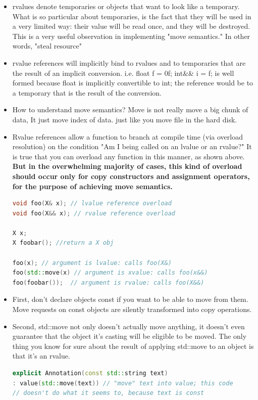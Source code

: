 \documentclass[a4paper,12pt,twoside]{book}
\begin{document}
\begin{itemize}
\item rvalues denote temporaries or objects that want to look like a temporary. What is so particular about temporaries, is the fact that they will be used in a very limited way: their value will be read once, and they will be destroyed. This is a very useful observation in implementing "move semantics." In other words, "steal resource"

\item rvalue references will implicitly bind to rvalues and to temporaries that are the result of an implicit conversion. i.e. float f = 0f; int\&\& i = f; is well formed because float is implicitly convertible to int; the reference would be to a temporary that is the result of the conversion.

\item How to understand move semantics? Move is not really move a big chunk of data, It just move index of data. just like you move file in the hard disk.

\item Rvalue references allow a function to branch at compile time (via overload resolution) on the condition "Am I being called on an lvalue or an rvalue?" It is true that you can overload any function in this manner, as shown above. \textbf{But in the overwhelming majority of cases, this kind of overload should occur only for copy constructors and assignment operators, for the purpose of achieving move semantics. }

\begin{lstlisting}[frame=single, language=c++]
void foo(X& x); // lvalue reference overload
void foo(X&& x); // rvalue reference overload

X x;
X foobar(); //return a X obj

foo(x); // argument is lvalue: calls foo(X&)
foo(std::move(x) // argument is xvalue: calls foo(x&&)
foo(foobar());  // argument is rvalue: calls foo(X&&)
\end{lstlisting}


\item First, don't declare objects const if you want to be able to move from them. Move requests on const objects are silently transformed into copy operations.

\item Second, std::move not only doesn't actually move anything, it doesn't even guarantee that the object it's casting will be eligible to be moved. The only thing you know for sure about the result of applying std::move to an object is that it's an rvalue.

\begin{lstlisting}[frame=single, language=c++]
explicit Annotation(const std::string text)
: value(std::move(text)) // "move" text into value; this code
// doesn't do what it seems to, because text is const
\end{lstlisting}

\end{itemize}
\end{document}
